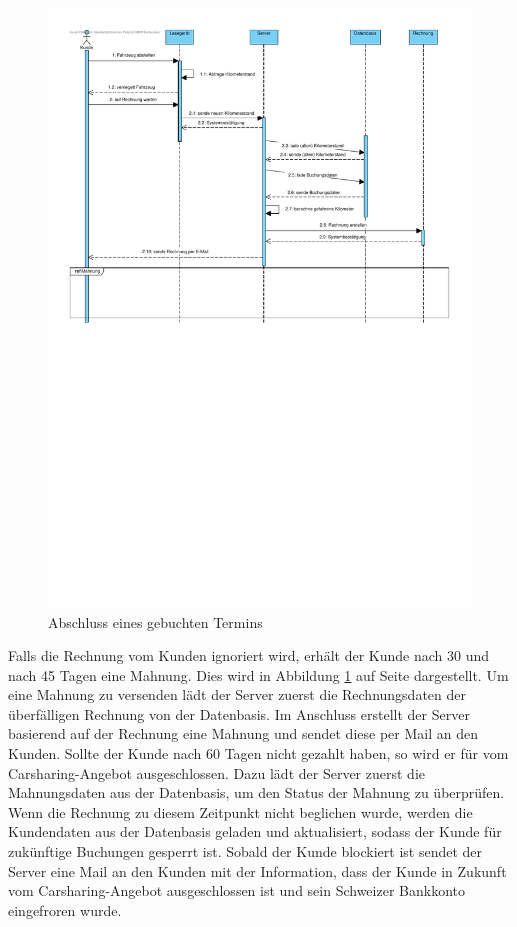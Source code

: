 \begin{figure}[!ht]
    \centering
    \includegraphics[width=\textwidth, trim = 0cm 14cm 0cm 0cm]{Bilder/Diagramme/SD_Buchungsvorgang_03.pdf}
    \caption{Abschluss eines gebuchten Termins}
    \label{img:buchung03}
\end{figure}

Falls die Rechnung vom Kunden ignoriert wird, erhält der Kunde nach 30 und nach 45 Tagen eine Mahnung. Dies wird in Abbildung \ref{img:buchung03} auf Seite \pageref{img:buchung03} dargestellt. Um eine Mahnung zu versenden lädt der Server zuerst die Rechnungsdaten der überfälligen Rechnung von der Datenbasis.
Im Anschluss erstellt der Server basierend auf der Rechnung eine Mahnung und sendet diese per Mail an den Kunden. Sollte der Kunde nach 60 Tagen nicht gezahlt haben, so wird er für vom Carsharing-Angebot ausgeschlossen. Dazu lädt der Server zuerst die Mahnungsdaten aus der Datenbasis, um den Status der Mahnung zu überprüfen. Wenn die Rechnung zu diesem Zeitpunkt nicht beglichen wurde, werden die Kundendaten aus der Datenbasis geladen und aktualisiert, sodass der Kunde für zukünftige Buchungen gesperrt ist. Sobald der Kunde blockiert ist sendet der Server eine Mail an den Kunden mit der Information, dass der Kunde in Zukunft vom Carsharing-Angebot ausgeschlossen ist und sein Schweizer Bankkonto eingefroren wurde.

